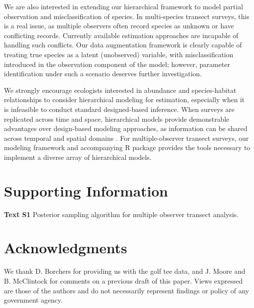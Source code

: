 \documentclass[10pt]{article}
\begin{document}
We are also interested in extending our hierarchical framework to model partial observation and misclassification of species.  In multi-species transect surveys, this is a real issue, as multiple observers often record species as unknown or have conflicting records.  Currently available estimation approaches are incapable of handling such conflicts.  Our data augmentation framework is clearly capable of treating true species as a latent (unobserved) variable, with misclassification introduced in the observation component of the model; however, parameter identification under such a scenario deserves further investigation.

We strongly encourage ecologists interested in abundance and species-habitat relationships to consider hierarchical modeling for estimation, especially when it is infeasible to conduct standard designed-based inference.  When surveys are replicated across time and space, hierarchical models provide demonstrable advantages over design-based modeling approaches, as information can be shared across temporal and spatial domains \cite{RoyleEtAl2007,MooreBarlow2011}.  For multiple-observer transect surveys, our modeling framework and accompanying R package provides the tools necessary to implement a diverse array of hierarchical models.

\section*{Supporting Information}

{\bf Text S1} Posterior sampling algorithm for multiple observer transect analysis.

\section*{Acknowledgments}
We thank D. Borchers for providing us with the golf tee data, and J. Moore and B. McClintock for comments on a previous draft of this paper.  Views expressed are those of the authors and do not necessarily represent findings or policy of any government agency.


\clearpage

\end{document}
